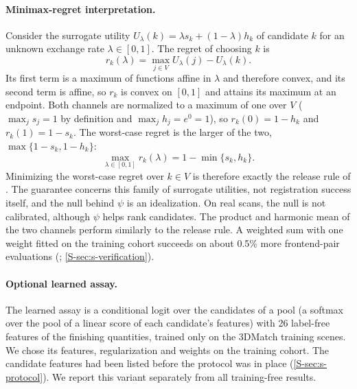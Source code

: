 \paragraph{Minimax-regret interpretation.} Consider the surrogate utility $U_\lambda(k)=\lambda s_k+(1-\lambda)h_k$ of candidate $k$ for an unknown exchange rate $\lambda\in[0,1]$. The regret of choosing $k$ is
\begin{equation}
r_k(\lambda)=\max_{j\in V}U_\lambda(j)-U_\lambda(k).
\label{S-eq:s-regret}
\end{equation}
Its first term is a maximum of functions affine in $\lambda$ and therefore convex, and its second term is affine, so $r_k$ is convex on $[0,1]$ and attains its maximum at an endpoint. Both channels are normalized to a maximum of one over $V$ ($\max_j s_j=1$ by definition and $\max_j h_j=e^0=1$), so $r_k(0)=1-h_k$ and $r_k(1)=1-s_k$. The worst-case regret is the larger of the two, $\max\{1-s_k,1-h_k\}$:
\begin{equation}
\max_{\lambda\in[0,1]}r_k(\lambda)=1-\min\{s_k,h_k\}.
\label{S-eq:s-worst}
\end{equation}
Minimizing the worst-case regret over $k\in V$ is therefore exactly the release rule of . The guarantee concerns this family of surrogate utilities, not registration success itself, and the null behind $\psi$ is an idealization. On real scans, the null is not calibrated, although $\psi$ helps rank candidates. The product and harmonic mean of the two channels perform similarly to the release rule. A weighted sum with one weight fitted on the training cohort succeeds on about 0.5\% more frontend-pair evaluations (; \cref{S-sec:s-verification}).

\paragraph{Optional learned assay.} The learned assay is a conditional logit over the candidates of a pool (a softmax over the pool of a linear score of each candidate's features) with 26 label-free features of the finishing quantities, trained only on the 3DMatch training scenes. We chose its features, regularization and weights on the training cohort. The candidate features had been listed before the protocol was in place (\cref{S-sec:s-protocol}). We report this variant separately from all training-free results.
